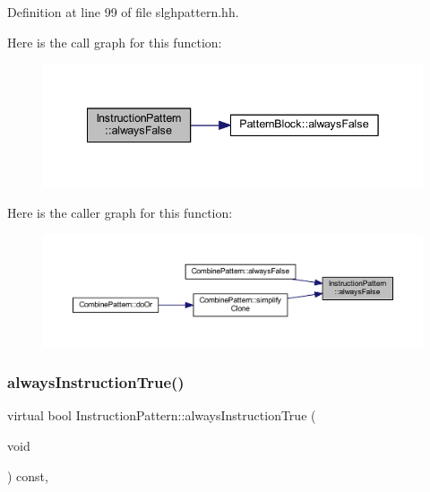 Definition at line 99 of file slghpattern.\+hh.

Here is the call graph for this function\+:
\nopagebreak
\begin{figure}[H]
\begin{center}
\leavevmode
\includegraphics[width=342pt]{class_instruction_pattern_a0b239a933cc9220adb175d602919986d_cgraph}
\end{center}
\end{figure}
Here is the caller graph for this function\+:
\nopagebreak
\begin{figure}[H]
\begin{center}
\leavevmode
\includegraphics[width=350pt]{class_instruction_pattern_a0b239a933cc9220adb175d602919986d_icgraph}
\end{center}
\end{figure}
\mbox{\label{class_instruction_pattern_a82ae35b557a32c6f208c6ff19967173b}} 
\subsubsection{\texorpdfstring{alwaysInstructionTrue()}{alwaysInstructionTrue()}}
{\footnotesize\ttfamily virtual bool Instruction\+Pattern\+::always\+Instruction\+True (\begin{DoxyParamCaption}\item[{void}]{ }\end{DoxyParamCaption}) const\hspace{0.3cm}{\ttfamily [inline]}, {\ttfamily [virtual]}}



